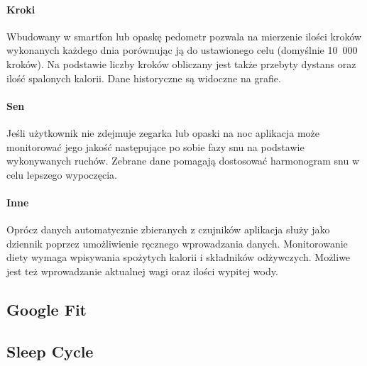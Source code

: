 \paragraph{Kroki} Wbudowany w smartfon lub opaskę pedometr pozwala na mierzenie ilości kroków wykonanych każdego dnia porównując ją do ustawionego celu (domyślnie 10~000 kroków). Na podstawie liczby kroków obliczany jest także przebyty dystans oraz ilość spalonych kalorii. Dane historyczne są widoczne na grafie.

\paragraph{Sen} Jeśli użytkownik nie zdejmuje zegarka lub opaski na noc aplikacja może monitorować jego jakość następujące po sobie fazy snu na podstawie wykonywanych ruchów. Zebrane dane pomagają dostosować harmonogram snu w celu lepszego wypoczęcia.

\paragraph{Inne} Oprócz danych automatycznie zbieranych z czujników aplikacja służy jako dziennik poprzez umożliwienie ręcznego wprowadzania danych. Monitorowanie diety wymaga wpisywania spożytych kalorii i składników odżywczych. Możliwe jest też wprowadzanie aktualnej wagi oraz ilości wypitej wody. 

\subsection{Google Fit}

\subsection{Sleep Cycle}
